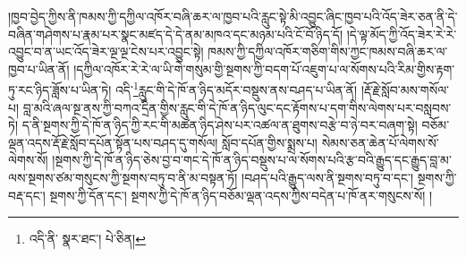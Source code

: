 །ཁྱབ་བྱེད་ཀྱིས་ནི་ཁམས་ཀྱི་དཀྱིལ་འཁོར་བཞི་ཆར་ལ་ཁྱབ་པའི་རླུང་སྟེ་མི་འབྱུང་ཞིང་ཁྱབ་པའི་འོད་ཟེར་ཅན་ནི་དེ་བཞིན་གཤེགས་པ་རྣམ་པར་སྣང་མཛད་དེ་དེ་ནམ་མཁའ་དང་མཉམ་པའི་ངོ་བོ་ཉིད་དོ། །དེ་ལྟ་མོད་ཀྱི་འོད་ཟེར་རེ་རེ་འབྱུང་བ་ན་ཡང་འོད་ཟེར་ལྔ་ལྔ་ངེས་པར་འབྱུང་སྟེ། ཁམས་ཀྱི་དཀྱིལ་འཁོར་གཅིག་གིས་ཀྱང་ཁམས་བཞི་ཆར་ལ་ཁྱབ་པ་ཡིན་ནོ། །དཀྱིལ་འཁོར་རེ་རེ་ལ་ཡི་གེ་གསུམ་གྱི་སྔགས་ཀྱི་བདག་པོ་འཇུག་པ་ལ་སོགས་པའི་རིམ་གྱིས་རྟག་ཏུ་རང་ཉིད་ཟློས་པ་ཡིན་ཏེ། འདི་\footnote{འདི་ནི་  སྣར་ཐང་།  པེ་ཅིན། }རླུང་གི་དེ་ཁོ་ན་ཉིད་མདོར་བསྡུས་ནས་བཤད་པ་ཡིན་ནོ། །རྡོ་རྗེ་སློབ་མས་གསོལ་པ། བླ་མའི་ཞལ་སྔ་ནས་ཀྱི་བཀའ་དྲིན་གྱིས་རླུང་གི་དེ་ཁོ་ན་ཉིད་ལུང་དང་རྟོགས་པ་དག་གིས་ལེགས་པར་བསླབས་ཏེ། ད་ནི་སྔགས་ཀྱི་དེ་ཁོ་ན་ཉིད་ཀྱི་རང་གི་མཚན་ཉིད་ཤེས་པར་འཚལ་ན་ཐུགས་བརྩེ་བ་ཉེ་བར་བཞག་སྟེ། བཅོམ་ལྡན་འདས་རྡོ་རྗེ་སློབ་དཔོན་སྟོན་པས་བཤད་དུ་གསོལ། སློབ་དཔོན་གྱིས་སྨྲས་པ། སེམས་ཅན་ཆེན་པོ་ལེགས་སོ་ལེགས་སོ། །སྔགས་ཀྱི་དེ་ཁོ་ན་ཉིད་ཅེས་བྱ་བ་གང་དེ་ཁོ་ན་ཉིད་བསྡུས་པ་ལ་སོགས་པའི་རྩ་བའི་རྒྱུད་དང་རྒྱུད་བླ་མ་ལས་སྔགས་ཙམ་གསུངས་ཀྱི་སྔགས་བཏུ་བ་ནི་མ་བསྟན་ཏོ། །བཤད་པའི་རྒྱུད་ལས་ནི་སྔགས་བཏུ་བ་དང་། སྔགས་ཀྱི་བརྡ་དང་། སྔགས་ཀྱི་དོན་དང་། སྔགས་ཀྱི་དེ་ཁོ་ན་ཉིད་བཅོམ་ལྡན་འདས་ཀྱིས་བདེན་པ་ཁོ་ནར་གསུངས་སོ། །
